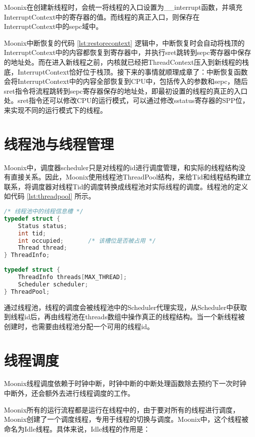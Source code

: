 Moonix在创建新线程时，会统一将线程的入口设置为\_\_interrupt函数，并填充InterruptContext中的寄存器的值。而线程的真正入口，则保存在InterruptContext中的sepc域中。

Moonix中断恢复的代码 \ref{lst:restorecontext} 逻辑中，中断恢复时会自动将栈顶的InterruptContext中的内容都恢复到寄存器中，并执行sret跳转到sepc寄存器中保存的地址处。而在进入新线程之前，内核就已经把ThreadContext压入到新线程的栈底，InterruptContext恰好位于栈顶。接下来的事情就顺理成章了：中断恢复函数会将InterruptContext中的内容全部恢复到CPU中，包括传入的参数和sepc，随后sret指令将流程跳转到sepc寄存器保存的地址处，即最初设置的线程的真正的入口处。sret指令还可以修改CPU的运行模式，可以通过修改sstatus寄存器的SPP位，来实现不同的运行模式下的线程。

\section{线程池与线程管理}

Moonix中，调度器scheduler只是对线程的id进行调度管理，和实际的线程结构没有直接关系。因此，Moonix使用线程池ThreadPool结构，来给Tid和线程结构建立联系，将调度器对线程Tid的调度转换成线程池对实际线程的调度。线程池的定义如代码 \ref{lst:threadpool} 所示。

\begin{lstlisting}[language={C}, caption={线程池定义}, label={lst:threadpool}]
/* 线程池中的线程信息槽 */
typedef struct {
	Status status;
	int tid;
	int occupied;       /* 该槽位是否被占用 */
	Thread thread;
} ThreadInfo;
	
typedef struct {
	ThreadInfo threads[MAX_THREAD];
	Scheduler scheduler;
} ThreadPool;
\end{lstlisting}

通过线程池，线程的调度会被线程池中的Scheduler代理实现，从Scheduler中获取到线程id后，再由线程池在threads数组中操作真正的线程结构。当一个新线程被创建时，也需要由线程池分配一个可用的线程id。

\section{线程调度}

Moonix线程调度依赖于时钟中断，时钟中断的中断处理函数除去预约下一次时钟中断外，还会额外去进行线程调度的工作。

Moonix所有的运行流程都是运行在线程中的，由于要对所有的线程进行调度，Moonix创建了一个调度线程，专用于线程的切换与调度。Moonix中，这个线程被命名为Idle线程。具体来说，Idle线程的作用是：

